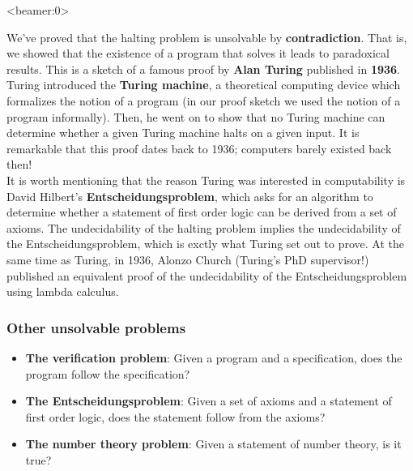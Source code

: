 \documentclass[handout, 12pt]{beamer}
\begin{document}
\begin{frame}<beamer:0>

\footnotesize
We've proved that the halting problem is unsolvable by \textbf{contradiction}. That is, we showed that the existence of a program that solves it leads to paradoxical results. This is a sketch of a famous proof by \textbf{Alan Turing} published in \textbf{1936}. Turing introduced the \textbf{Turing machine}, a theoretical computing device which formalizes the notion of a program (in our proof sketch we used the notion of a program informally). Then, he went on to show that no Turing machine can determine whether a given Turing machine halts on a given input. It is remarkable that this proof dates back to 1936; computers barely existed back then!
\\[0.6em]
It is worth mentioning that the reason Turing was interested in computability is David Hilbert's \textbf{Entscheidungsproblem}, which asks for an algorithm to determine whether a statement of first order logic can be derived from a set of axioms. The undecidability of the halting problem implies the undecidability of the Entscheidungsproblem, which is exctly what Turing set out to prove. At the same time as Turing, in 1936, Alonzo Church (Turing's PhD supervisor!) published an equivalent proof of the undecidability of the Entscheidungsproblem using lambda calculus.

\end{frame}

\begin{frame}

\frametitle{Other unsolvable problems}

\begin{itemize}
\addtolength{\itemsep}{1\baselineskip}
\pause\item \textbf{The verification problem}: Given a program and a specification, does the program follow the specification?
\pause\item \textbf{The Entscheidungsproblem}: Given a set of axioms and a statement of first order logic, does the statement follow from the axioms?
\pause\item \textbf{The number theory problem}: Given a statement of number theory, is it true?
\end{itemize}

\end{frame}
\end{document}

